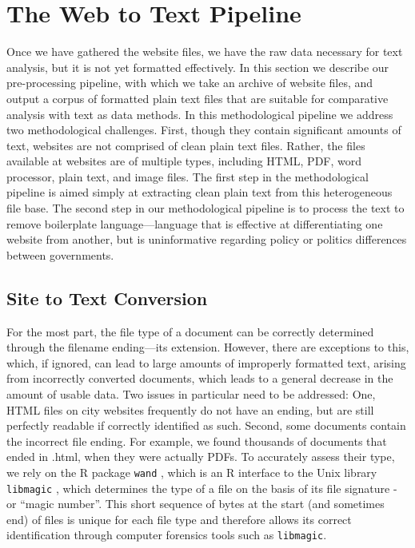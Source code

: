 \documentclass[11pt]{article}
\begin{document}
\section{The Web to Text Pipeline}

Once we have gathered the website files, we have the raw data necessary for text analysis, but it is not yet formatted effectively. In this section we describe our pre-processing pipeline, with which we take an archive of website files, and output a corpus of formatted plain text files that are suitable for comparative analysis with text as data methods. In this methodological pipeline we address two methodological challenges. First, though they contain significant amounts of text, websites are not comprised of clean plain text files. Rather, the files available at websites are of multiple types, including HTML, PDF, word processor, plain text, and image files. The first step in the methodological pipeline is aimed simply at extracting clean plain text from this heterogeneous file base. The second step in our methodological pipeline is to process the text to remove boilerplate language---language that is effective at differentiating one website from another, but is uninformative regarding policy or politics differences between governments. 



\subsection{Site to Text Conversion}
For the most part, the file type of a document can be correctly determined through the filename ending---its extension. However, there are exceptions to this, which, if ignored, can lead to large amounts of improperly formatted text, arising from incorrectly converted documents, which leads to a general decrease in the amount of usable data. Two issues in particular need to be addressed: One, HTML files on city websites frequently do not have an ending, but are still perfectly readable if correctly identified as such. Second, some documents contain the incorrect file ending. For example, we found thousands of documents that ended in .html, when they were actually PDFs. To accurately assess their type, we rely on the R package \texttt{wand} \citep{wand}, which is an R interface to the Unix library \texttt{libmagic} \citep{darwin2008libmagic}, which determines the type of a file on the basis of its file signature - or ``magic number''. This short sequence of bytes at the start (and sometimes end) of files is unique for each file type and therefore allows its correct identification through computer forensics tools such as \texttt{libmagic}.
\end{document}
